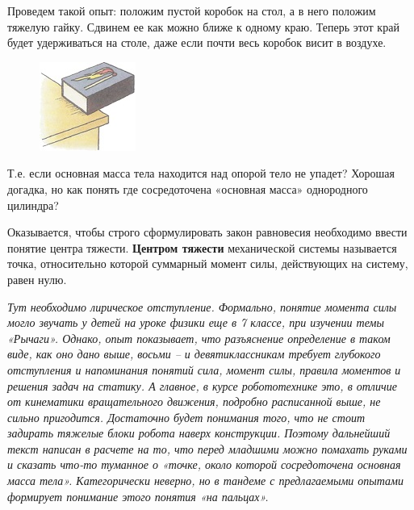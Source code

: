 Проведем такой опыт: положим пустой коробок на стол, а в него положим  тяжелую гайку. Сдвинем ее как можно ближе к одному краю. Теперь этот край будет удерживаться на столе, даже если почти весь коробок висит в воздухе.
\begin{figure}[h!]
	\begin{center}
		\includegraphics[width=0.5\linewidth]{chapters/chapter8/images/3}
		\caption{}
		\label{ris:image8x3}
	\end{center}
\end{figure}

Т.е. если основная масса тела находится над опорой тело не упадет? Хорошая догадка, но как понять где сосредоточена «основная масса» однородного цилиндра? 

Оказывается, чтобы строго сформулировать закон равновесия необходимо ввести понятие центра тяжести. {\bfseries Центром тяжести} механической системы называется точка, относительно которой суммарный момент силы, действующих на систему, равен нулю. 

{\slshape Тут необходимо лирическое отступление. Формально, понятие момента силы могло звучать у детей на уроке физики еще в 7 классе, при изучении темы «Рычаги». Однако, опыт показывает, что разъяснение определение в таком виде, как оно дано выше,  восьми – и девятиклассникам требует глубокого отступления и напоминания понятий сила, момент силы, правила моментов и решения задач на статику. А главное, в курсе робототехнике это, в отличие от кинематики вращательного движения, подробно расписанной выше, не сильно пригодится. Достаточно будет понимания того, что не стоит задирать тяжелые блоки робота наверх конструкции. Поэтому дальнейший текст написан в расчете на то, что перед младшими можно помахать руками и сказать что-то туманное о «точке, около которой сосредоточена основная масса тела». Категорически неверно, но в тандеме с предлагаемыми опытами формирует понимание этого понятия «на пальцах».}

